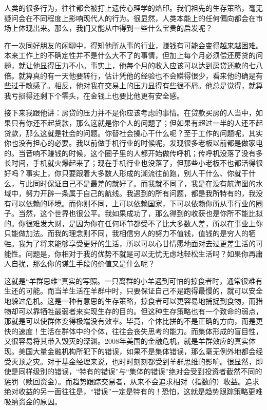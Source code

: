 人类的很多行为，往往都会被打上遗传心理学的烙印。我们祖先的生存策略，毫无疑问会在不同程度上影响现代人的行为。很显然，人类本能上的任何偏向都会在市场上体现出来。那么，我们又能从中得到一些什么宝贵的启发呢？

在一次同好朋友的闲聊中，得知他所从事的行业，赚钱有可能会变得越来越困难。本来工作上的不确定性并不是什么大不了的事情，但加上每个月必须偿还房贷的问题，就让他显得压力不小。事实上，他每个月的收入应该可以达到房贷还款的七八倍。就算真的有一天他要转行，估计凭他的经验也不会赚得很少，看来他的确是有些过于敏感了。相反，他对我在交易上的压力显得有些很不屑。他总是觉得，就算我亏损得还剩下个零头，在金钱上也要比他更有安全感。

接下来我跟他讲：房贷的压力并不是你应该考虑的事情。在贷款买房的人当中，如果只有你还不起贷款，那么这就是你个人的问题了；但如果有超过一半的人还不起贷款，那么这就是社会的问题。你替社会操心干什么呢？至于工作的问题呢，其实你也没有担心的必要。我以前做手机行业的时候呢，发现很多老板以前都是做家电的。当音响不赚钱的时候，这个圈子里的人都开始做传呼机；传呼机没落了没有多长时间，手机就火爆起来了；现在手机行业也没落了，但那些小老板不也都活得很好吗？事实上，你只要跟着大多数人形成的潮流往前跑，别人干什么、你就干什么，与此同时保证自己不是最差的就好了。而我就不同了，我是在没有航海图的水域中，努力开辟一条属于自己的航线。我遇到的所有问题，都是我所特有的，我没有可以依赖的环境。而你则不同，上可以依赖国家，下可以依赖你所从事行业的圈子。当然，这个世界也很公平。我如果成功了，那么得到的收获也是你所不能比拟的。你很难发大财，是因为你在任何环节都受不了比大多数人差，所以在事业上你只能做加法。而我的理念则不同，我相信穷人的努力不值钱，值钱的是穷人的牺牲。我为了将来能够享受更好的生活，所以可以心甘情愿地面对去过更差生活的可能性。问题是，你相对于我的优势不就是可以无忧无虑地轻松生活吗？如果你再庸人自扰，那么你的谋生手段的价值又是什么呢？

这就是“羊群思维”真实的写照。一只离群的小羊遇到可怕的掠食者时，通常很难有生还的可能。而当羊生活在羊群中时，只要保证自己不是跑得最慢的，就可以安全地躲过危机。这是一种有意思的生存策略，掠食者可以更容易地捕捉到食物，而猎物却可以靠牺牲最弱者来实现生存的目的。但这种生存策略也有一个致命的弱点，那就是可以使群体变得极端没有效率。毕竟，个体比拼的不是正确的方向，而是更快的速度！生活在群体中的个体，往往会丧失思考的能力。而集体形成的盲目性，又很容易将其带入毁灭的深渊。2008年美国的金融危机，就是羊群效应的真实体现。美国大量金融机构所犯下的错误，如果不是集体错误，那么毫无例外地都会经受灭顶之灾。对于基金经理来说，也时时刻刻都受到羊群思维的影响。很显然，即使是同样级别的错误，“特有的错误”与“集体的错误”绝对会受到投资者截然不同的惩罚（赎回资金）。而趋势跟踪交易者，从来不会追求相对（指数的）收益。追求绝对收益的另一面往往是，“错误”一定是特有的！恐怕，这就是趋势跟踪策略更难吸纳资金的原因。

